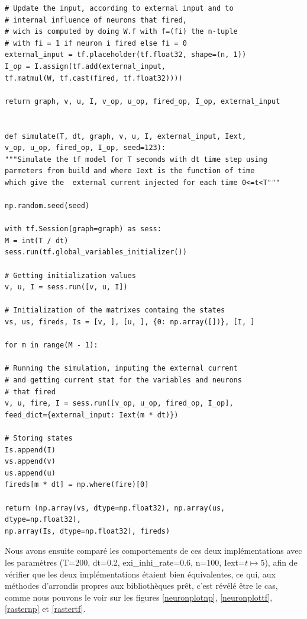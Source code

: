 \documentclass[12pt]{scrartcl}
\begin{document}
\begin{lstlisting}[caption = {Numpy vs Tensorflow : Implémentation Tensorflow}]
# Update the input, according to external input and to
# internal influence of neurons that fired, 
# wich is computed by doing W.f with f=(fi) the n-tuple
# with fi = 1 if neuron i fired else fi = 0
external_input = tf.placeholder(tf.float32, shape=(n, 1))
I_op = I.assign(tf.add(external_input,
tf.matmul(W, tf.cast(fired, tf.float32))))

return graph, v, u, I, v_op, u_op, fired_op, I_op, external_input


def simulate(T, dt, graph, v, u, I, external_input, Iext,
v_op, u_op, fired_op, I_op, seed=123):
"""Simulate the tf model for T seconds with dt time step using 
parmeters from build and where Iext is the function of time 
which give the  external current injected for each time 0<=t<T"""

np.random.seed(seed)

with tf.Session(graph=graph) as sess:
M = int(T / dt)
sess.run(tf.global_variables_initializer())

# Getting initialization values
v, u, I = sess.run([v, u, I])

# Initialization of the matrixes containg the states
vs, us, fireds, Is = [v, ], [u, ], {0: np.array([])}, [I, ]

for m in range(M - 1):

# Running the simulation, inputing the external current
# and getting current stat for the variables and neurons
# that fired
v, u, fire, I = sess.run([v_op, u_op, fired_op, I_op],
feed_dict={external_input: Iext(m * dt)})

# Storing states
Is.append(I)
vs.append(v)
us.append(u)
fireds[m * dt] = np.where(fire)[0]

return (np.array(vs, dtype=np.float32), np.array(us, dtype=np.float32),
np.array(Is, dtype=np.float32), fireds)
\end{lstlisting}

\clearpage
Nous avons ensuite comparé les comportements de ces deux implémentations avec les paramètres (T=200, dt=0.2, exi\_inhi\_rate=0.6, n=100, Iext=$t\mapsto 5$), afin de vérifier que les deux implémentations étaient bien équivalentes, ce qui, aux méthodes d'arrondis propres aux bibliothèques prêt, c'est révélé être le cas, comme nous pouvons le voir sur les figures \ref{neuronplotnp}, \ref{neuronplottf}, \ref{rasternp} et \ref{rastertf}.\\
\end{document}
